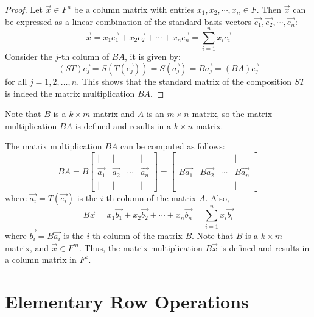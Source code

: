 \documentclass[
	11pt, %
	fleqn, %
	a4paper, %
]{LegrandOrangeBook}
\begin{document}
\begin{proof}
    Let $\vec{x} \in F^n$ be a column matrix with entries $x_1, x_2, \cdots, x_n \in F$. Then $\vec{x}$ can be expressed as a linear combination of the standard basis vectors $\vec{e_1}, \vec{e_2}, \cdots, \vec{e_n}$:
    \[
        \vec{x} = x_1 \vec{e_1} + x_2 \vec{e_2} + \cdots + x_n \vec{e_n} = \sum_{i=1}^{n} x_i \vec{e_i}
    \]
    Consider the $j$-th column of $BA$, it is given by:
    \[
        (ST)\vec{e_j} = S(T(\vec{e_j})) = S(\vec{a_j}) = B\vec{a_j} = (BA)\vec{e_j}
    \]
    for all $j = 1, 2, \ldots, n$. This shows that the standard matrix of the composition $ST$ is indeed the matrix multiplication $BA$.
\end{proof}

\begin{remark}
    Note that $B$ is a $k \times m$ matrix and $A$ is an $m \times n$ matrix, so the matrix multiplication $BA$ is defined and results in a $k \times n$ matrix.
\end{remark}

\begin{remark}
    The matrix multiplication $BA$ can be computed as follows:
    \[
        BA = B\begin{bmatrix}
            | & | & & | \\
            \vec{a_1} & \vec{a_2} & \cdots & \vec{a_n} \\
            | & | & & |
        \end{bmatrix} = \begin{bmatrix}
            | & | & & | \\
            B\vec{a_1} & B\vec{a_2} & \cdots & B\vec{a_n} \\
            | & | & & |
        \end{bmatrix}
    \]
    where $\vec{a_i} = T(\vec{e_i})$ is the $i$-th column of the matrix $A$. Also, 
    \[
        B\vec{x} = x_1 \vec{b_1} + x_2 \vec{b_2} + \cdots + x_n \vec{b_n} = \sum_{i=1}^{n} x_i \vec{b_i}
    \]
    where $\vec{b_i} = B\vec{a_i}$ is the $i$-th column of the matrix $B$. Note that $B$ is a $k \times m$ matrix, and $\vec{x} \in F^m$. Thus, the matrix multiplication $B\vec{x}$ is defined and results in a column matrix in $F^k$.
\end{remark}

\newpage

\section{Elementary Row Operations}
\end{document}

